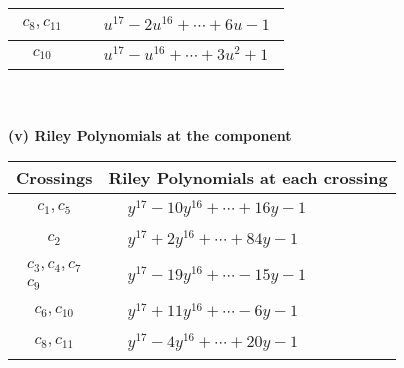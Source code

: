 \documentclass[1p]{elsarticle_modified}
\theoremstyle{definition}
\begin{document}
\begin{tabular}{m{50pt}|m{274pt}}
\hline $$\begin{aligned}c_{8},c_{11}\end{aligned}$$&$\begin{aligned}
&u^{17}-2 u^{16}+\cdots+6 u-1
\end{aligned}$\\
\hline $$\begin{aligned}c_{10}\end{aligned}$$&$\begin{aligned}
&u^{17}- u^{16}+\cdots+3 u^2+1
\end{aligned}$\\
\hline
\end{tabular}\\~\\
\newpage\renewcommand{\arraystretch}{1}
\flushleft \textbf{(v) Riley Polynomials at the component}\newline \\
\begin{tabular}{m{50pt}|m{274pt}}
Crossings & \hspace{64pt}Riley Polynomials at each crossing \\
\hline $$\begin{aligned}c_{1},c_{5}\end{aligned}$$&$\begin{aligned}
&y^{17}-10 y^{16}+\cdots+16 y-1
\end{aligned}$\\
\hline $$\begin{aligned}c_{2}\end{aligned}$$&$\begin{aligned}
&y^{17}+2 y^{16}+\cdots+84 y-1
\end{aligned}$\\
\hline $$\begin{aligned}c_{3},c_{4},c_{7}\\c_{9}\end{aligned}$$&$\begin{aligned}
&y^{17}-19 y^{16}+\cdots-15 y-1
\end{aligned}$\\
\hline $$\begin{aligned}c_{6},c_{10}\end{aligned}$$&$\begin{aligned}
&y^{17}+11 y^{16}+\cdots-6 y-1
\end{aligned}$\\
\hline $$\begin{aligned}c_{8},c_{11}\end{aligned}$$&$\begin{aligned}
&y^{17}-4 y^{16}+\cdots+20 y-1
\end{aligned}$\\
\hline
\end{tabular}\\~\\
\end{document}
